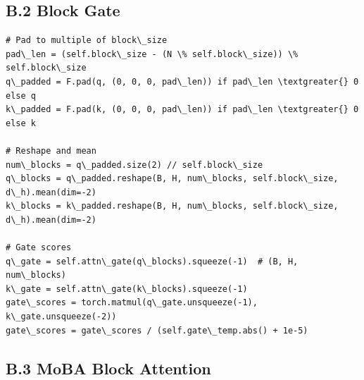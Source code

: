 \subsection{B.2 Block Gate}

\begin{lstlisting}
# Pad to multiple of block\_size
pad\_len = (self.block\_size - (N \% self.block\_size)) \% self.block\_size
q\_padded = F.pad(q, (0, 0, 0, pad\_len)) if pad\_len \textgreater{} 0 else q
k\_padded = F.pad(k, (0, 0, 0, pad\_len)) if pad\_len \textgreater{} 0 else k

# Reshape and mean
num\_blocks = q\_padded.size(2) // self.block\_size
q\_blocks = q\_padded.reshape(B, H, num\_blocks, self.block\_size, d\_h).mean(dim=-2)
k\_blocks = k\_padded.reshape(B, H, num\_blocks, self.block\_size, d\_h).mean(dim=-2)

# Gate scores
q\_gate = self.attn\_gate(q\_blocks).squeeze(-1)  # (B, H, num\_blocks)
k\_gate = self.attn\_gate(k\_blocks).squeeze(-1)
gate\_scores = torch.matmul(q\_gate.unsqueeze(-1), k\_gate.unsqueeze(-2))
gate\_scores = gate\_scores / (self.gate\_temp.abs() + 1e-5)
\end{lstlisting}

\subsection{B.3 MoBA Block Attention}

